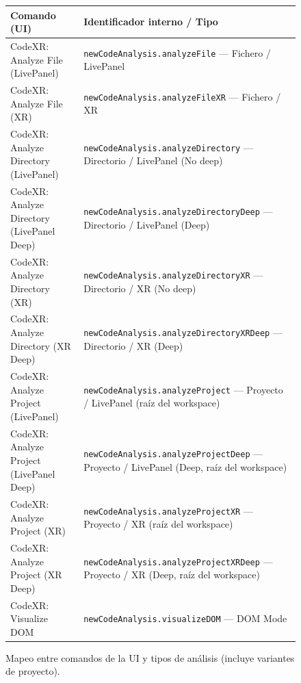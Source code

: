 \documentclass[a4paper, 12pt]{book}
\begin{document}
\begin{figure}[H]
\centering\small
\begin{tabular}{p{9.0cm} p{6.0cm}}
\hline
\textbf{Comando (UI)} & \textbf{Identificador interno / Tipo} \\
\hline
CodeXR: Analyze File (LivePanel) & \texttt{newCodeAnalysis.analyzeFile} — Fichero / LivePanel \\
CodeXR: Analyze File (XR) & \texttt{newCodeAnalysis.analyzeFileXR} — Fichero / XR \\
CodeXR: Analyze Directory (LivePanel) & \texttt{newCodeAnalysis.analyzeDirectory} — Directorio / LivePanel (No deep) \\
CodeXR: Analyze Directory (LivePanel Deep) & \texttt{newCodeAnalysis.analyzeDirectoryDeep} — Directorio / LivePanel (Deep) \\
CodeXR: Analyze Directory (XR) & \texttt{newCodeAnalysis.analyzeDirectoryXR} — Directorio / XR (No deep) \\
CodeXR: Analyze Directory (XR Deep) & \texttt{newCodeAnalysis.analyzeDirectoryXRDeep} — Directorio / XR (Deep) \\
CodeXR: Analyze Project (LivePanel) & \texttt{newCodeAnalysis.analyzeProject} — Proyecto / LivePanel (raíz del workspace) \\
CodeXR: Analyze Project (LivePanel Deep) & \texttt{newCodeAnalysis.analyzeProjectDeep} — Proyecto / LivePanel (Deep, raíz del workspace) \\
CodeXR: Analyze Project (XR) & \texttt{newCodeAnalysis.analyzeProjectXR} — Proyecto / XR (raíz del workspace) \\
CodeXR: Analyze Project (XR Deep) & \texttt{newCodeAnalysis.analyzeProjectXRDeep} — Proyecto / XR (Deep, raíz del workspace) \\
CodeXR: Visualize DOM & \texttt{newCodeAnalysis.visualizeDOM} — DOM Mode \\
\hline
\end{tabular}
\caption{Mapeo entre comandos de la UI y tipos de análisis (incluye variantes de proyecto).}
\label{tab:comandos-analisis}
\end{figure}

\bigskip
\end{document}
